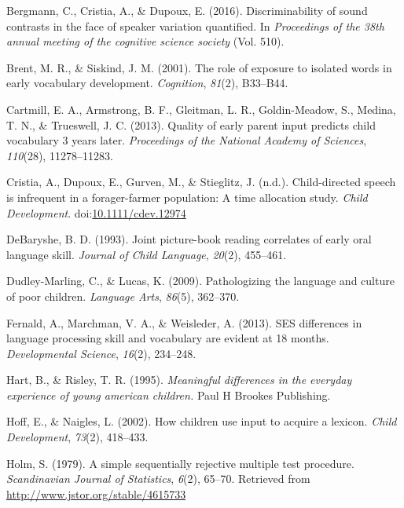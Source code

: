 \documentclass[floatsintext,man]{apa6}
\theoremstyle{definition}
\theoremstyle{definition}
\theoremstyle{definition}
\theoremstyle{remark}
\begin{document}
\leavevmode\hypertarget{ref-bergmann2016discriminability}{}%
Bergmann, C., Cristia, A., \& Dupoux, E. (2016). Discriminability of
sound contrasts in the face of speaker variation quantified. In
\emph{Proceedings of the 38th annual meeting of the cognitive science
society} (Vol. 510).

\leavevmode\hypertarget{ref-brent2001role}{}%
Brent, M. R., \& Siskind, J. M. (2001). The role of exposure to isolated
words in early vocabulary development. \emph{Cognition}, \emph{81}(2),
B33--B44.

\leavevmode\hypertarget{ref-cartmill2013quality}{}%
Cartmill, E. A., Armstrong, B. F., Gleitman, L. R., Goldin-Meadow, S.,
Medina, T. N., \& Trueswell, J. C. (2013). Quality of early parent input
predicts child vocabulary 3 years later. \emph{Proceedings of the
National Academy of Sciences}, \emph{110}(28), 11278--11283.

\leavevmode\hypertarget{ref-cristia2017child}{}%
Cristia, A., Dupoux, E., Gurven, M., \& Stieglitz, J. (n.d.).
Child-directed speech is infrequent in a forager-farmer population: A
time allocation study. \emph{Child Development}.
doi:\href{https://doi.org/10.1111/cdev.12974}{10.1111/cdev.12974}

\leavevmode\hypertarget{ref-debaryshe1993joint}{}%
DeBaryshe, B. D. (1993). Joint picture-book reading correlates of early
oral language skill. \emph{Journal of Child Language}, \emph{20}(2),
455--461.

\leavevmode\hypertarget{ref-dudley2009pathologizing}{}%
Dudley-Marling, C., \& Lucas, K. (2009). Pathologizing the language and
culture of poor children. \emph{Language Arts}, \emph{86}(5), 362--370.

\leavevmode\hypertarget{ref-fernald2013ses}{}%
Fernald, A., Marchman, V. A., \& Weisleder, A. (2013). SES differences
in language processing skill and vocabulary are evident at 18 months.
\emph{Developmental Science}, \emph{16}(2), 234--248.

\leavevmode\hypertarget{ref-hart1995meaningful}{}%
Hart, B., \& Risley, T. R. (1995). \emph{Meaningful differences in the
everyday experience of young american children.} Paul H Brookes
Publishing.

\leavevmode\hypertarget{ref-hoff2002children}{}%
Hoff, E., \& Naigles, L. (2002). How children use input to acquire a
lexicon. \emph{Child Development}, \emph{73}(2), 418--433.

\leavevmode\hypertarget{ref-holm1979simple}{}%
Holm, S. (1979). A simple sequentially rejective multiple test
procedure. \emph{Scandinavian Journal of Statistics}, \emph{6}(2),
65--70. Retrieved from \url{http://www.jstor.org/stable/4615733}
\end{document}
